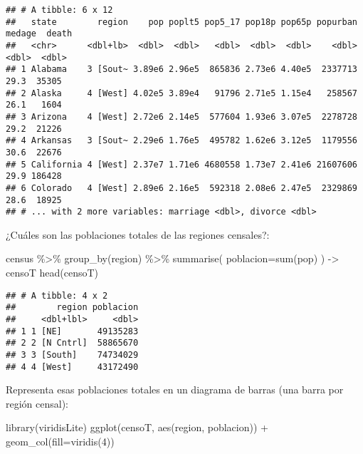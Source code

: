 \documentclass[
]{article}
\newenvironment{Shaded}{\begin{snugshade}}{\end{snugshade}}
\newcommand{\AttributeTok}[1]{\textcolor[rgb]{0.77,0.63,0.00}{#1}}
\newcommand{\DecValTok}[1]{\textcolor[rgb]{0.00,0.00,0.81}{#1}}
\newcommand{\FunctionTok}[1]{\textcolor[rgb]{0.00,0.00,0.00}{#1}}
\newcommand{\NormalTok}[1]{#1}
\newcommand{\OtherTok}[1]{\textcolor[rgb]{0.56,0.35,0.01}{#1}}
\newcommand{\SpecialCharTok}[1]{\textcolor[rgb]{0.00,0.00,0.00}{#1}}
\begin{document}
\begin{verbatim}
## # A tibble: 6 x 12
##   state        region    pop poplt5 pop5_17 pop18p pop65p popurban medage  death
##   <chr>      <dbl+lb>  <dbl>  <dbl>   <dbl>  <dbl>  <dbl>    <dbl>  <dbl>  <dbl>
## 1 Alabama    3 [Sout~ 3.89e6 2.96e5  865836 2.73e6 4.40e5  2337713   29.3  35305
## 2 Alaska     4 [West] 4.02e5 3.89e4   91796 2.71e5 1.15e4   258567   26.1   1604
## 3 Arizona    4 [West] 2.72e6 2.14e5  577604 1.93e6 3.07e5  2278728   29.2  21226
## 4 Arkansas   3 [Sout~ 2.29e6 1.76e5  495782 1.62e6 3.12e5  1179556   30.6  22676
## 5 California 4 [West] 2.37e7 1.71e6 4680558 1.73e7 2.41e6 21607606   29.9 186428
## 6 Colorado   4 [West] 2.89e6 2.16e5  592318 2.08e6 2.47e5  2329869   28.6  18925
## # ... with 2 more variables: marriage <dbl>, divorce <dbl>
\end{verbatim}

¿Cuáles son las poblaciones totales de las regiones censales?:

\begin{Shaded}
\begin{Highlighting}[]
\NormalTok{census }\SpecialCharTok{\%\textgreater{}\%} \FunctionTok{group\_by}\NormalTok{(region) }\SpecialCharTok{\%\textgreater{}\%} \FunctionTok{summarise}\NormalTok{( }\AttributeTok{poblacion=}\FunctionTok{sum}\NormalTok{(pop) ) }\OtherTok{{-}\textgreater{}}\NormalTok{ censoT}
\FunctionTok{head}\NormalTok{(censoT)}
\end{Highlighting}
\end{Shaded}

\begin{verbatim}
## # A tibble: 4 x 2
##        region poblacion
##     <dbl+lbl>     <dbl>
## 1 1 [NE]       49135283
## 2 2 [N Cntrl]  58865670
## 3 3 [South]    74734029
## 4 4 [West]     43172490
\end{verbatim}

Representa esas poblaciones totales en un diagrama de barras (una barra
por región censal):

\begin{Shaded}
\begin{Highlighting}[]
\FunctionTok{library}\NormalTok{(viridisLite)}
\FunctionTok{ggplot}\NormalTok{(censoT, }\FunctionTok{aes}\NormalTok{(region, poblacion)) }\SpecialCharTok{+}
  \FunctionTok{geom\_col}\NormalTok{(}\AttributeTok{fill=}\FunctionTok{viridis}\NormalTok{(}\DecValTok{4}\NormalTok{))}
\end{Highlighting}
\end{Shaded}
\end{document}
